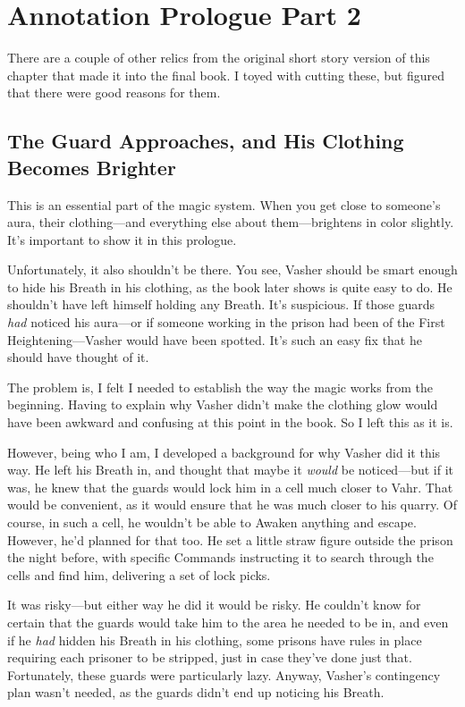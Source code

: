\section{Annotation Prologue Part 2}

There are a couple of other relics from the original short story version of this chapter that made it into the final book. I toyed with cutting these, but figured that there were good reasons for them.

\subsection*{The Guard Approaches, and His Clothing Becomes Brighter}

This is an essential part of the magic system. When you get close to someone’s aura, their clothing—and everything else about them—brightens in color slightly. It’s important to show it in this prologue.

Unfortunately, it also shouldn’t be there. You see, Vasher should be smart enough to hide his Breath in his clothing, as the book later shows is quite easy to do. He shouldn’t have left himself holding any Breath. It’s suspicious. If those guards \textit{had} noticed his aura—or if someone working in the prison had been of the First Heightening—Vasher would have been spotted. It’s such an easy fix that he should have thought of it.

The problem is, I felt I needed to establish the way the magic works from the beginning. Having to explain why Vasher didn’t make the clothing glow would have been awkward and confusing at this point in the book. So I left this as it is.

However, being who I am, I developed a background for why Vasher did it this way. He left his Breath in, and thought that maybe it \textit{would} be noticed—but if it was, he knew that the guards would lock him in a cell much closer to Vahr. That would be convenient, as it would ensure that he was much closer to his quarry. Of course, in such a cell, he wouldn’t be able to Awaken anything and escape. However, he’d planned for that too. He set a little straw figure outside the prison the night before, with specific Commands instructing it to search through the cells and find him, delivering a set of lock picks.

It was risky—but either way he did it would be risky. He couldn’t know for certain that the guards would take him to the area he needed to be in, and even if he \textit{had} hidden his Breath in his clothing, some prisons have rules in place requiring each prisoner to be stripped, just in case they’ve done just that. Fortunately, these guards were particularly lazy. Anyway, Vasher’s contingency plan wasn’t needed, as the guards didn’t end up noticing his Breath.

